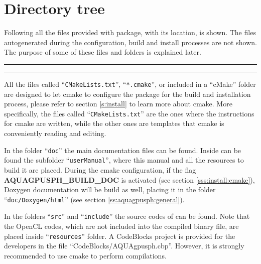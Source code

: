 \chapter{Directory tree}
%
Following all the files provided with \NAME package, with its location, is 
shown.
%
The files autogenerated during the configuration, build and install processes 
are not shown.
%
The purpose of some of these files and folders is explained later.

\vspace{0.5cm}
\rule{\textwidth}{1pt}
\vspace{0.5cm}

\vspace{0.5cm}
\rule{\textwidth}{1pt}
\vspace{0.5cm}

All the files called ``\texttt{CMakeLists.txt}'', ``\texttt{*.cmake}'', or 
included in a ``cMake'' folder are designed to let cmake to configure the 
package for the build and installation process, please refer to section 
\ref{s:install} to learn more about cmake.
%
More specifically, the files called ``\texttt{CMakeLists.txt}'' are the ones 
where the instructions for cmake are written, while the other ones are 
templates that cmake is conveniently reading and editing.

In the folder ``\texttt{doc}'' the main documentation files can be found.
%
Inside can be found the subfolder ``\texttt{userManual}'', where this manual 
and all the resources to build it are placed.
%
During the cmake configuration, if the flag \textbf{AQUAGPUSPH\_BUILD\_DOC} 
is  activated (see section \ref{sss:install:cmake}), Doxygen documentation 
will be  build as well, placing it in the folder ``\texttt{doc/Doxygen/html}'' 
(see section \ref{ss:aquagpusph:general}).

In the folders ``\texttt{src}'' and ``\texttt{include}'' the source codes of 
\NAME can be found.
%
Note that the OpenCL codes, which are not included into the \NAME compiled 
binary file, are placed inside ``\texttt{resources}'' folder.
%
A CodeBlocks project is provided for the developers in the file 
``CodeBlocks/AQUAgpusph.cbp''.
%
However, it is strongly recommended to use cmake to perform compilations.

